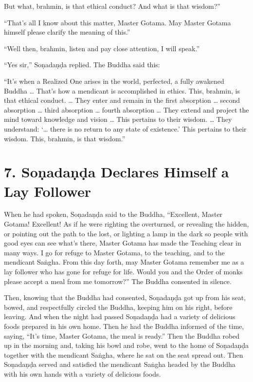 \documentclass[12pt,openany]{book}%
\begin{document}
But what, brahmin, is that ethical conduct? And what is that wisdom?” 

“That’s all I know about this matter, Master Gotama. May Master Gotama himself please clarify the meaning of this.” 

“Well then, brahmin, listen and pay close attention, I will speak.” 

“Yes sir,” \textsanskrit{Soṇadaṇḍa} replied. The Buddha said this: 

“It’s when a Realized One arises in the world, perfected, a fully awakened Buddha … That’s how a mendicant is accomplished in ethics. This, brahmin, is that ethical conduct. … They enter and remain in the first absorption … second absorption … third absorption … fourth absorption … They extend and project the mind toward knowledge and vision … This pertains to their wisdom. … They understand: ‘… there is no return to any state of existence.’ This pertains to their wisdom. This, brahmin, is that wisdom.” 

\section*{7. \textsanskrit{Soṇadaṇḍa} Declares Himself a Lay Follower }

When he had spoken, \textsanskrit{Soṇadaṇḍa} said to the Buddha, “Excellent, Master Gotama! Excellent! As if he were righting the overturned, or revealing the hidden, or pointing out the path to the lost, or lighting a lamp in the dark so people with good eyes can see what’s there, Master Gotama has made the Teaching clear in many ways. I go for refuge to Master Gotama, to the teaching, and to the mendicant \textsanskrit{Saṅgha}. From this day forth, may Master Gotama remember me as a lay follower who has gone for refuge for life. Would you and the Order of monks please accept a meal from me tomorrow?” The Buddha consented in silence. 

Then, knowing that the Buddha had consented, \textsanskrit{Soṇadaṇḍa} got up from his seat, bowed, and respectfully circled the Buddha, keeping him on his right, before leaving. And when the night had passed \textsanskrit{Soṇadaṇḍa} had a variety of delicious foods prepared in his own home. Then he had the Buddha informed of the time, saying, “It’s time, Master Gotama, the meal is ready.” Then the Buddha robed up in the morning and, taking his bowl and robe, went to the home of \textsanskrit{Soṇadaṇḍa} together with the mendicant \textsanskrit{Saṅgha}, where he sat on the seat spread out. Then \textsanskrit{Soṇadaṇḍa} served and satisfied the mendicant \textsanskrit{Saṅgha} headed by the Buddha with his own hands with a variety of delicious foods. 
\end{document}
